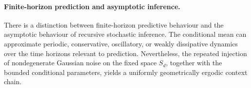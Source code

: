 \paragraph{Finite-horizon prediction and asymptotic inference.}
There is a distinction between finite-horizon predictive behaviour and the asymptotic behaviour of recursive stochastic inference. The conditional mean can approximate periodic, conservative, oscillatory, or weakly dissipative dynamics over the time horizons relevant to prediction. Nevertheless, the repeated injection of nondegenerate Gaussian noise on the fixed space \(S_d\), together with the bounded conditional parameters, yields a uniformly geometrically ergodic context chain.